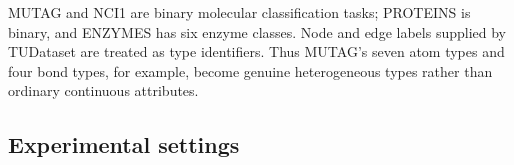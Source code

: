 \begin{table}[H]
  \centering
  \caption{Graph-classification dataset statistics.}
  \label{tab:graph-datasets}
  \small
\end{table}

MUTAG and NCI1 are binary molecular classification tasks; PROTEINS is binary, and ENZYMES has six
enzyme classes. Node and edge labels supplied by TUDataset are treated as type identifiers. Thus
MUTAG's seven atom types and four bond types, for example, become genuine heterogeneous types
rather than ordinary continuous attributes.

\begin{table}[H]
  \centering
  \caption{Heterogeneous link-prediction dataset statistics and target relations.}
  \label{tab:link-datasets}
  \small
\end{table}

\subsection{Experimental settings}

